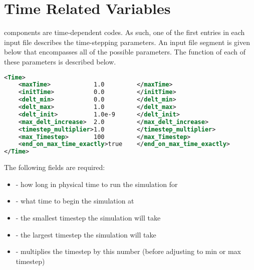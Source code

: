 \section{Time Related Variables} \label{Sec:TimeRelatedVariables}
\Vaango components are time-dependent codes.  As such, one of the first
entries in each input file describes the time-stepping parameters.  An
input file segment is given below that encompasses all of the possible
parameters.  The function of each of these parameters is described below.

\begin{lstlisting}[language=XML]
<Time>
    <maxTime>            1.0         </maxTime>
    <initTime>           0.0         </initTime>
    <delt_min>           0.0         </delt_min>
    <delt_max>           1.0         </delt_max>
    <delt_init>          1.0e-9      </delt_init>
    <max_delt_increase>  2.0         </max_delt_increase>
    <timestep_multiplier>1.0         </timestep_multiplier>
    <max_Timestep>       100         </max_Timestep>
    <end_on_max_time_exactly>true    </end_on_max_time_exactly>
</Time>
\end{lstlisting}

The following fields are required:
\begin{itemize}
\item {} - how long in physical time to run the simulation for
\item {} - what time to begin the simulation at
\item {} - the smallest timestep the simulation will take
\item {} - the largest timestep the simulation will take
\item {} - multiplies the timestep by this number (before adjusting to min or max timestep)
\end{itemize}

